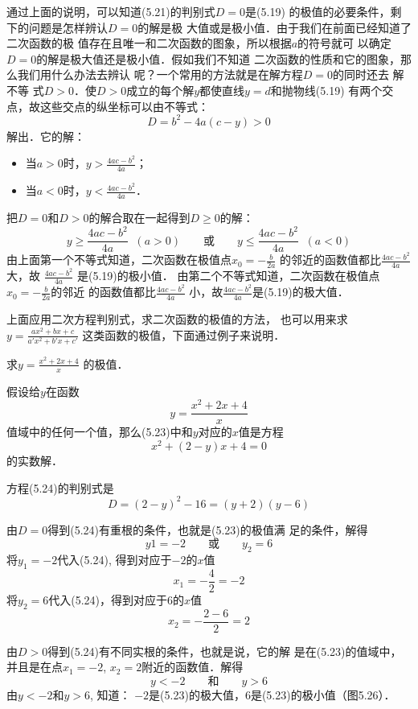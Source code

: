 通过上面的说明，可以知道(5.21)的判别式$D=0$是(5.19)
的极值的必要条件，剩下的问题是怎样辨认$D=0$的解是极
大值或是极小值．由于我们在前面已经知道了二次函数的极
值存在且唯一和二次函数的图象，所以根据$a$的符号就可
以确定$D=0$的解是极大值还是极小值．假如我们不知道
二次函数的性质和它的图象，那么我们用什么办法去辨认
呢？一个常用的方法就是在解方程$D=0$的同时还去 解不等
式$D>0$．使$D>0$成立的每个解$y$都使直线$y=d$和抛物线(5.19)
有两个交点，故这些交点的纵坐标可以由不等式：
\[D=b^2-4a(c-y)>0\]
解出．它的解：
\begin{itemize}
    \item 当$a>0$时，$y>\frac{4ac-b^2}{4a}$；
    \item 当$a<0$时，$y<\frac{4ac-b^2}{4a}$．
\end{itemize}

把$D=0$和$D>0$的解合取在一起得到$D\ge 0$的解：
\[y\ge \frac{4ac-b^2}{4a}\;\; (a>0)\qquad \text{或}\qquad y\le \frac{4ac-b^2}{4a}\;\; (a<0)\]
由上面第一个不等式知道，二次函数在极值点$x_0=-\frac{b}{2a}$
的邻近的函数值都比$\frac{4ac-b^2}{4a}$大，故
$\frac{4ac-b^2}{4a}$
是(5.19)的极小值．
由第二个不等式知道，二次函数在极值点$x_0=-\frac{b}{2a}$的邻近
的函数值都比$\frac{4ac-b^2}{4a}$
小，故$\frac{4ac-b^2}{4a}$是(5.19)的极大值．

上面应用二次方程判别式，求二次函数的极值的方法，
也可以用来求$y=\frac{ax^2+bx+c}{a'x^2+b'x+c'}$
这类函数的极值，下面通过例子来说明．





\begin{example}
    求$y=\frac{x^2+2x+4}{x}$
的极值．
\end{example}

\begin{solution}
    假设给$y$在函数
    \begin{equation}
        y=\frac{x^2+2x+4}{x}
    \end{equation}
    值域中的任何一个值，那么(5.23)中和$y$对应的$x$值是方程
    \begin{equation}
        x^2+(2-y)x+4=0
    \end{equation}
    的实数解．

    方程(5.24)的判别式是
    \begin{equation}
        D=(2-y)^2-16=(y+2)(y-6)
    \end{equation}

    由$D=0$得到(5.24)有重根的条件，也就是(5.23)的极值满
    足的条件，解得
 \[   y1=-2\qquad \text{或}\qquad y_2=6\]
    将$y_1=-2$代入(5.24), 得到对应于$-2$的$x$值
  \[  x_1=-\frac{4}{2}=-2\]
    将$y_2=6$代入(5.24)，得到对应于6的$x$值
    \[x_2=-\frac{2-6}{2}=2\]

    由$D>0$得到(5.24)有不同实根的条件，也就是说，它的解
    是在(5.23)的值域中，并且是在点$x_1=-2$, $x_2=2$附近的函数值．解得
  \[  y<-2\qquad \text{和}\qquad y>6\]
    由$y<-2$和$y>6$, 知道：
    $-2$是(5.23)的极大值，6是(5.23)的极小值（图5.26）．
\end{solution}



